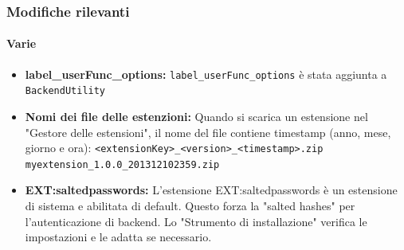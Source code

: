 \begin{frame}[fragile]
	\frametitle{Modifiche rilevanti}
	\framesubtitle{Varie}

	\begin{itemize}

		\item \textbf{label\_userFunc\_options:}\newline
			\small
				\texttt{label\_userFunc\_options} è stata aggiunta a \texttt{BackendUtility}
			\normalsize

		\item \textbf{Nomi dei file delle estenzioni:}\newline
			\small
				Quando si scarica un estensione nel "Gestore delle estensioni", il nome del file contiene timestamp (anno, mese, giorno e ora):\newline
				\texttt{<extensionKey>\_<version>\_<timestamp>.zip}\newline
				\texttt{myextension\_1.0.0\_201312102359.zip}
			\normalsize

		\item \textbf{EXT:saltedpasswords:}\newline
			\small
				L'estensione EXT:saltedpasswords è un estensione di sistema e abilitata di default.
				Questo forza la "salted hashes" per l'autenticazione di backend. Lo "Strumento di installazione" verifica le impostazioni e le adatta se necessario.
			\normalsize

	\end{itemize}
	
\end{frame}


